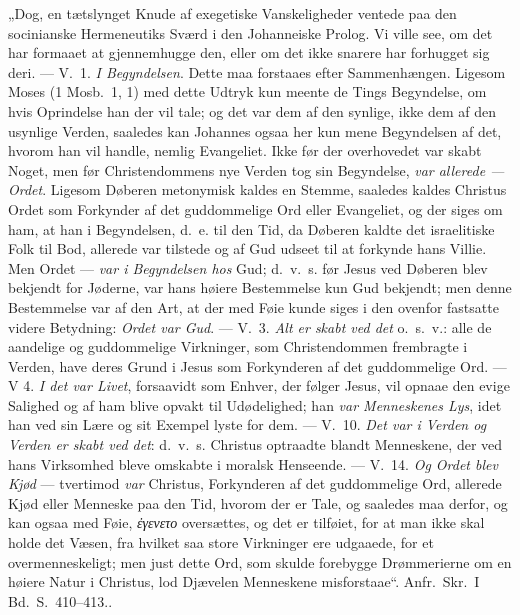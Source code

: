 \documentclass[12pt]{book}
\begin{document}
{„Dog, en tætslynget Knude af exegetiske Vanskeligheder ventede paa
den socinianske Hermeneutiks Sværd i den Johanneiske Prolog. Vi ville
see, om det har formaaet at gjennemhugge den, eller om det ikke
snarere har forhugget sig deri. --- V.\ 1. \emph{I Begyndelsen}.
Dette maa forstaaes efter Sammenhængen. Ligesom Moses (1 Mosb.\ 1, 1)
med dette Udtryk kun meente de Tings Begyndelse, om hvis Oprindelse
han der vil tale; og det var dem af den synlige, ikke dem af den
usynlige Verden, saaledes kan Johannes ogsaa her kun mene
Begyndelsen af det, hvorom han vil handle, nemlig Evangeliet. Ikke
før der overhovedet var skabt Noget, men før Christendommens nye
Verden tog sin Begyndelse, \emph{var allerede --- Ordet}. Ligesom
Døberen metonymisk kaldes en Stemme, saaledes kaldes Christus Ordet
som Forkynder af det guddommelige Ord eller Evangeliet, og der siges
om ham, at han i Begyndelsen, d.\ e. til den Tid, da Døberen kaldte
det israelitiske Folk til Bod, allerede var tilstede og af Gud udseet
til at forkynde hans Villie. Men Ordet --- \emph{var i Begyndelsen
hos} Gud;
d.\ v.\ s. før Jesus ved Døberen blev bekjendt for Jøderne, var hans
høiere Bestemmelse kun Gud bekjendt; men denne Bestemmelse var af den
Art, at der med Føie kunde siges i den ovenfor fastsatte videre
Betydning: \emph{Ordet var Gud}. --- V.\ 3. \emph{Alt er skabt ved
det} o.\ s.\ v.: alle de aandelige og guddommelige Virkninger, som
Christendommen frembragte i Verden, have deres Grund i Jesus som
Forkynderen af det guddommelige Ord. --- V 4. \emph{I det var Livet},
forsaavidt som Enhver, der følger Jesus, vil opnaae den evige
Salighed og af ham blive opvakt til Udødelighed; han \emph{var
Menneskenes Lys}, idet han ved sin Lære og sit Exempel lyste for dem.
--- V.\ 10. \emph{Det var i Verden og Verden er skabt ved det}:
d.\ v.\ s. Christus optraadte blandt Menneskene, der ved hans
Virksomhed bleve omskabte i moralsk Henseende. --- V.\ 14. \emph{Og
Ordet blev Kjød} --- tvertimod \emph{var} Christus, Forkynderen af
det guddommelige Ord, allerede Kjød eller Menneske paa den Tid,
hvorom der er Tale, og saaledes maa derfor, og kan ogsaa med Føie,
\textit{ἐγενετο} oversættes, og det er tilføiet, for at man ikke skal
holde det Væsen, fra hvilket saa store Virkninger ere udgaaede, for
et overmenneskeligt; men just dette Ord, som skulde forebygge
Drømmerierne om en høiere Natur i Christus, lod Djævelen Menneskene
misforstaae“. Anfr.\ Skr.\ I Bd.\ S.\ 410--413.}.
\end{document}
